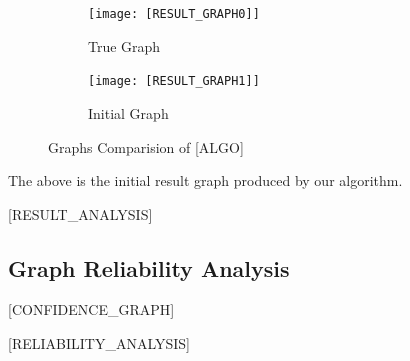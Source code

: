 \documentclass{article}
\begin{document}
\begin{figure}[H]
    \centering
    \begin{subfigure}{0.45\textwidth}
        \centering
        \vspace{-0.5cm}
        \texttt{[image: [RESULT\_GRAPH0]]}
        \vfill
        \caption{True Graph}
        \label{fig:sub1}
    \end{subfigure}
    \hspace{0.04\textwidth}
    \begin{subfigure}{0.45\textwidth}
        \centering
        \vspace{-0.5cm}
        \texttt{[image: [RESULT\_GRAPH1]]}
        \vfill
        \caption{Initial Graph}
        \label{fig:sub2}
    \end{subfigure}
    \label{fig:main}
    \caption{Graphs Comparision of [ALGO]}
\end{figure}

The above is the initial result graph produced by our algorithm.

[RESULT_ANALYSIS]

\subsection{Graph Reliability Analysis}

[CONFIDENCE_GRAPH]

[RELIABILITY_ANALYSIS]

\end{document}

